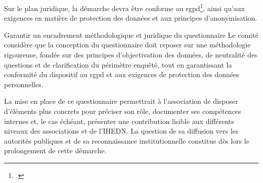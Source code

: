 Sur le plan juridique, la démarche devra être conforme au \gls{rgpd}\footcite{RGPD_CNIL}, ainsi qu'aux exigences en matière de protection des données et aux principes d'anonymisation.

\begin{subproposition}{Garantir un encadrement méthodologique et juridique du questionnaire}
Le comité considère que la conception du questionnaire doit reposer sur une méthodologie rigoureuse, fondée sur des principes d'objectivation des données, de neutralité des questions et de clarification du périmètre enquêté, tout en garantissant la conformité du dispositif au \gls{rgpd} et aux exigences de protection des données personnelles.
\end{subproposition}

La mise en place de ce questionnaire permettrait à l'association de disposer d'éléments plus concrets pour préciser son rôle, documenter ses compétences internes et, le cas échéant, présenter une contribution lisible aux différents niveaux des associations et de l'IHEDN. La question de sa diffusion vers les autorités publiques et de sa reconnaissance institutionnelle constitue dès lors le prolongement de cette démarche.
